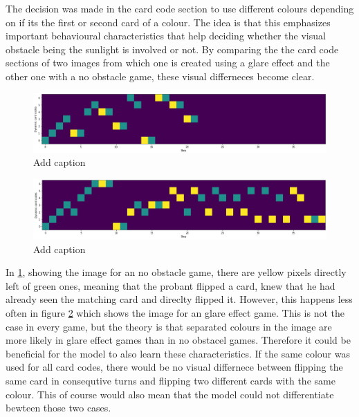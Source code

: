 The decision was made in the card code section to use different colours depending on if its the first or second card of a colour. The idea is that this emphasizes important behavioural characteristics that help deciding whether the visual obstacle being the sunlight is involved or not. By comparing the the card code sections of two images from which one is created using a glare effect and the other one with a no obstacle game, these visual differneces become clear. 
\begin{figure}[H]
	\centering
	\includegraphics[width=15cm]{images/cardCodesNoObst.png}
	\caption[Bild kurz]{Add caption}
	\label{fig:ccNo}
\end{figure}
\begin{figure}[H]
	\centering
	\includegraphics[width=15cm]{images/cardCodesGlare.png}
	\caption[Bild kurz]{Add caption}
	\label{fig:ccGlare}
\end{figure}

In \ref{fig:ccNo}, showing the image for an no obstacle game, there are yellow pixels directly left of green ones, meaning that the probant flipped a card, knew that he had already seen the matching card and direclty flipped it. However, this happens less often in figure \ref{fig:ccGlare} which shows the image for an glare effect game. This is not the case in every game, but the theory is that separated colours in the image are more likely in glare effect games than in no obstacel games. Therefore it could be beneficial for the model to also learn these characteristics. If the same colour was used for all card codes, there would be no visual differnece between flipping the same card in consequtive turns and flipping two different cards with the same colour. This of course would also mean that the model could not differentiate bewteen those two cases. 


